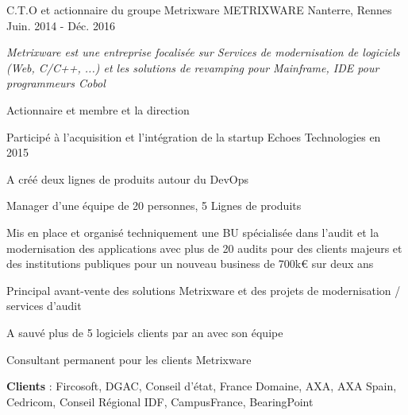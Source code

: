 

\begin{cventries}

  \cventry
    {C.T.O et actionnaire du groupe Metrixware} %
    {METRIXWARE} %
    {Nanterre, Rennes} %
    {Juin. 2014 - Déc. 2016} %
    {
      \begin{cvitems} %
        \item {\textit{Metrixware est une entreprise focalisée sur Services de modernisation de logiciels (Web, C/C++, ...) et les solutions de revamping pour Mainframe, IDE pour programmeurs Cobol}}
        \item {Actionnaire et membre et la direction}
        \item {Participé à l'acquisition et l'intégration de la startup Echoes Technologies en 2015}
        \item {A créé deux lignes de produits autour du DevOps}
        \item {Manager d'une équipe de 20 personnes, 5 Lignes de produits}
        \item {Mis en place et organisé techniquement une BU spécialisée dans l'audit et la modernisation des applications avec plus de 20 audits pour des clients majeurs et des institutions publiques pour un nouveau business de 700k€ sur deux ans}
        \item {Principal avant-vente des solutions Metrixware et des projets de modernisation / services d'audit}
        \item {A sauvé plus de 5 logiciels clients par an avec son équipe}
        \item {Consultant permanent pour les clients Metrixware}
        \item {\textbf{Clients} : Fircosoft, DGAC, Conseil d'état, France Domaine, AXA, AXA Spain, Cedricom, Conseil Régional IDF, CampusFrance, BearingPoint}
      \end{cvitems}
    }


\end{cventries}
